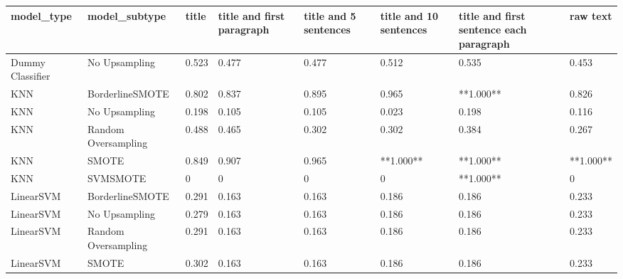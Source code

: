 \begin{tabular}{llllllll}
\toprule
                  model\_type &       model\_subtype & title & title and first paragraph & title and 5 sentences & title and 10 sentences & title and first sentence each paragraph &  raw text \\
\midrule
            Dummy Classifier &       No Upsampling & 0.523 &                     0.477 &                 0.477 &                  0.512 &                                   0.535 &     0.453 \\
                         KNN &     BorderlineSMOTE & 0.802 &                     0.837 &                 0.895 &                  0.965 &                               **1.000** &     0.826 \\
                         KNN &       No Upsampling & 0.198 &                     0.105 &                 0.105 &                  0.023 &                                   0.198 &     0.116 \\
                         KNN & Random Oversampling & 0.488 &                     0.465 &                 0.302 &                  0.302 &                                   0.384 &     0.267 \\
                         KNN &               SMOTE & 0.849 &                     0.907 &                 0.965 &              **1.000** &                               **1.000** & **1.000** \\
                         KNN &            SVMSMOTE &     0 &                         0 &                     0 &                      0 &                               **1.000** &         0 \\
                   LinearSVM &     BorderlineSMOTE & 0.291 &                     0.163 &                 0.163 &                  0.186 &                                   0.186 &     0.233 \\
                   LinearSVM &       No Upsampling & 0.279 &                     0.163 &                 0.163 &                  0.186 &                                   0.186 &     0.233 \\
                   LinearSVM & Random Oversampling & 0.291 &                     0.163 &                 0.163 &                  0.186 &                                   0.186 &     0.233 \\
                   LinearSVM &               SMOTE & 0.302 &                     0.163 &                 0.163 &                  0.186 &                                   0.186 &     0.233 \\

\end{tabular}
